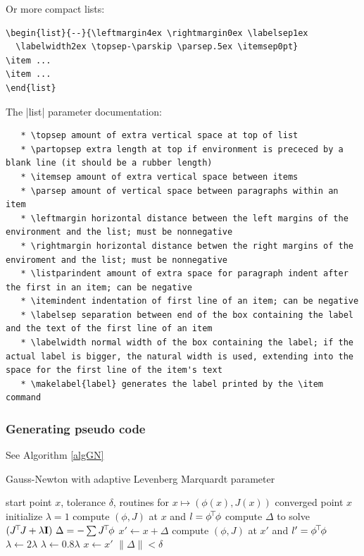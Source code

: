 Or more compact lists:\\
\begin{code}
\begin{verbatim}
\begin{list}{--}{\leftmargin4ex \rightmargin0ex \labelsep1ex
  \labelwidth2ex \topsep-\parskip \parsep.5ex \itemsep0pt}
\item ...
\item ...
\end{list}
\end{verbatim}
\end{code}

The |list| parameter documentation:\\
\begin{code}
\begin{verbatim}
   * \topsep amount of extra vertical space at top of list
   * \partopsep extra length at top if environment is prececed by a blank line (it should be a rubber length)
   * \itemsep amount of extra vertical space between items
   * \parsep amount of vertical space between paragraphs within an item
   * \leftmargin horizontal distance between the left margins of the environment and the list; must be nonnegative
   * \rightmargin horizontal distance betwen the right margins of the enviroment and the list; must be nonnegative
   * \listparindent amount of extra space for paragraph indent after the first in an item; can be negative
   * \itemindent indentation of first line of an item; can be negative
   * \labelsep separation between end of the box containing the label and the text of the first line of an item
   * \labelwidth normal width of the box containing the label; if the actual label is bigger, the natural width is used, extending into the space for the first line of the item's text
   * \makelabel{label} generates the label printed by the \item command
\end{verbatim}
\end{code}

\subsubsection{Generating pseudo code}

See Algorithm \ref{algGN}

\begin{algorithm}[ht]
\caption{Gauss-Newton with adaptive Levenberg Marquardt parameter}
\label{algGN}
\begin{algorithmic}[1]\small
\REQUIRE start point $x$, tolerance $\delta$, routines for $x \mapsto
  (\phi(x), J(x))$
\ENSURE converged point $x$
\STATE initialize $\lambda=1$
\STATE compute $(\phi, J)$ at $x$ and $l=\phi^{\!\top\!} \phi$
\REPEAT
\STATE\label{redo} compute $\Delta$ to solve $(J^{\!\top\!} J +\lambda {\rm\bf I})~ \Delta = - \sum
J^{\!\top\!} \phi$
\STATE $x' \gets x + \Delta$
\STATE compute $(\phi, J)$ at $x'$ and $l'=\phi^{\!\top\!} \phi$
\STATE $\lambda \gets 2\lambda$
\ELSE
\STATE $\lambda \gets 0.8\lambda$
\STATE $x \gets x'$
\ENDIF
\UNTIL $\|\Delta\| < \delta$
\end{algorithmic}
\end{algorithm}


